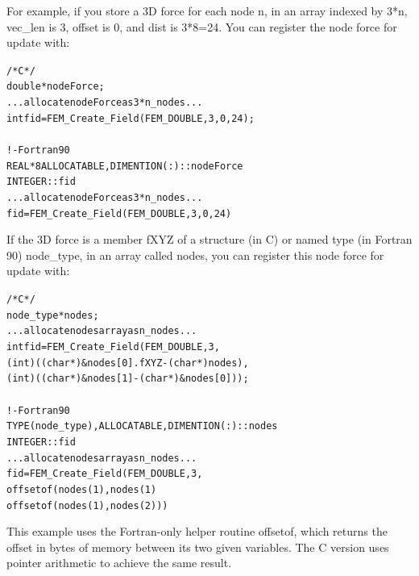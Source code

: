 \documentclass[11pt]{article}
\begin{document}
{     For example, if you store a 3D force for each node n, in an array
     indexed by 3*n, vec\_len is 3, offset is 0, and dist is 3*8=24.
     You can register the node force for update with:

\begin{alltt}
          /* C */\\
          double *nodeForce;\\
          ... allocate nodeForce as 3*n\_nodes...\\
          int fid=FEM\_Create\_Field(FEM\_DOUBLE,3,0,24);\\
 \\
          ! - Fortran90\\
          REAL*8 ALLOCATABLE, DIMENTION(:) :: nodeForce\\
          INTEGER :: fid\\
          ... allocate nodeForce as 3*n\_nodes...\\
          fid=FEM\_Create\_Field(FEM\_DOUBLE,3,0,24)\\
\end{alltt}

     If the 3D force is a member fXYZ of a structure (in C) or named
     type (in Fortran 90) node\_type, in an array called nodes, you can
     register this node force for update with:

\begin{alltt}
          /* C */\\
          node\_type *nodes;\\
          ...allocate nodes array as n\_nodes...\\
          int fid=FEM\_Create\_Field(FEM\_DOUBLE,3,\\
              (int)((char *)\&nodes[0].fXYZ-(char *)nodes),\\
              (int)((char *)\&nodes[1]-(char *)\&nodes[0]) );\\
 \\
          ! - Fortran90\\
          TYPE(node\_type), ALLOCATABLE, DIMENTION(:) :: nodes\\
          INTEGER :: fid\\
          ...allocate nodes array as n\_nodes...\\
          fid=FEM\_Create\_Field(FEM\_DOUBLE,3,\\
              offsetof(nodes(1), nodes(1)%
              offsetof(nodes(1), nodes(2)) )\\
\end{alltt}

     This example uses the Fortran-only helper routine offsetof, which
     returns the offset in bytes of memory between its two given
     variables.  The C version uses pointer arithmetic to achieve the
     same result.
}
\end{document}
